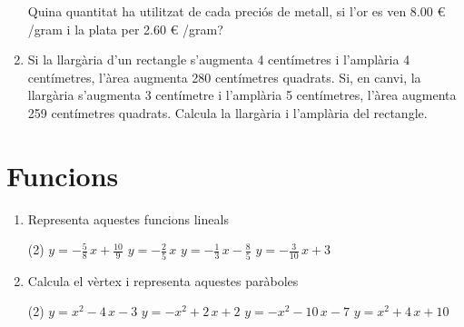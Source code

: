 \documentclass[a4paper]{article}
\begin{document}
\begin{enumerate}[resume]
                      Quina quantitat ha utilitzat de cada preciós de metall, si l'or es ven 8.00 \euro{} /gram i la plata
                      per 2.60 \euro{} /gram?
      \item Si la llargària d'un rectangle s'augmenta 4 centímetres i l'amplària 4 centímetres, l'àrea augmenta 280
                      centímetres quadrats. Si, en canvi, la llargària s'augmenta 3 centímetre i l'amplària 5 centímetres, l'àrea
                      augmenta 259 centímetres quadrats. Calcula la llargària i l'amplària del rectangle.
       \end{enumerate}
  
    \section{Funcions}
       \begin{enumerate}[resume]
      \item Representa aquestes funcions lineals
      \begin{tasks}(2)
        \task $y = -\frac{5}{8}\,x+ \frac{10}{9}$
        \task $y = -\frac{2}{5}\,x$
        \task $y = -\frac{1}{3}\,x -\frac{8}{5}$
        \task $y = -\frac{3}{10}\,x+ 3$
      \end{tasks}
      \item Calcula el vèrtex i representa aquestes paràboles
      \begin{tasks}(2)
        \task $y = x^2 -4\,x -3$
        \task $y = -x^2+ 2\,x+ 2$
        \task $y = -x^2 -10\,x -7$
        \task $y = x^2+ 4\,x+ 10$
      \end{tasks}
       \end{enumerate}
  
\end{document}

